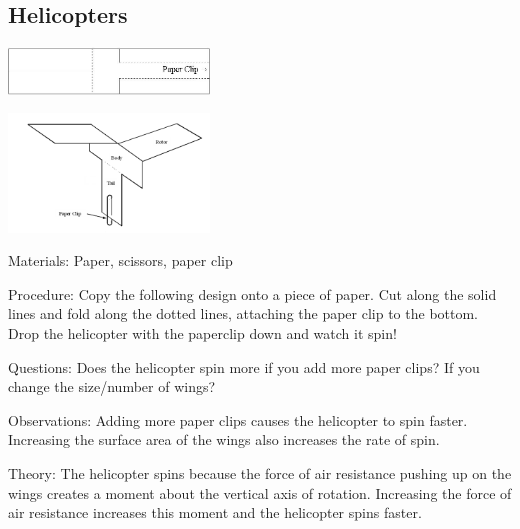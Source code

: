 \begin{multicols}{2}
\subsection{Helicopters}

\begin{center}
\includegraphics[width=0.4\textwidth]{./img/helicopter-1.png}
\end{center}

\begin{center}
\includegraphics[width=0.4\textwidth]{./img/helicopter-2.png}
\end{center}

\begin{description*}
\item[Materials:]{Paper, scissors, paper clip}
\item[Procedure:]{Copy the following design onto a piece of paper. Cut along the solid lines and fold along the dotted lines, attaching the paper clip to the bottom. Drop the helicopter with the paperclip down and watch it spin!}
\item[Questions:]{Does the helicopter spin more if you add more paper clips? If you change the size/number of wings?}
\item[Observations:]{Adding more paper clips causes the helicopter to spin faster. Increasing the surface area of the wings also increases the rate of spin.}
\item[Theory:]{The helicopter spins because the force of air resistance pushing up on the wings creates a moment about the vertical axis of rotation. Increasing the force of air resistance increases this moment and the helicopter spins faster.}
\end{description*}


\end{multicols}
